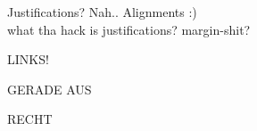 \documentclass{article}
\begin{document}
Justifications? Nah.. Alignments :)\\
what tha hack is justifications? margin-shit?


\begin{flushleft}
LINKS!
\end{flushleft}

\begin{center}
GERADE AUS
\end{center}

\begin{flushright}
RECHT
\end{flushright}
\end{document}
